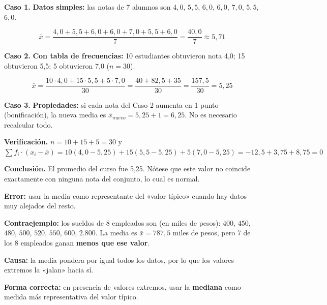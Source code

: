 \documentclass[11pt, letterpaper]{article}
\begin{document}
\begin{tcolorbox}[examplebox, title={Ej. 7. Media aritmética: datos simples, con frecuencia y propiedades}]
\noindent\textbf{Caso 1.} \textbf{Datos simples:} las notas de 7 alumnos son $4{,}0$, $5{,}5$, $6{,}0$, $6{,}0$, $7{,}0$, $5{,}5$, $6{,}0$.

  \[
  \bar{x} = \frac{4{,}0 + 5{,}5 + 6{,}0 + 6{,}0 + 7{,}0 + 5{,}5 + 6{,}0}{7} = \frac{40{,}0}{7} \approx 5{,}71
  \]
\medskip

\noindent\textbf{Caso 2.} \textbf{Con tabla de frecuencias:} 10 estudiantes obtuvieron nota 4{,}0; 15 obtuvieron 5{,}5; 5 obtuvieron 7{,}0 ($n = 30$).

  \[
  \bar{x} = \frac{10 \cdot 4{,}0 + 15 \cdot 5{,}5 + 5 \cdot 7{,}0}{30} = \frac{40 + 82{,}5 + 35}{30} = \frac{157{,}5}{30} = 5{,}25
  \]
\medskip

\noindent\textbf{Caso 3.} \textbf{Propiedades:} si cada nota del Caso 2 aumenta en 1 punto (bonificación), la nueva media es $\bar{x}_{nuevo} = 5{,}25 + 1 = 6{,}25$. No es necesario recalcular todo.
\medskip

\noindent\textbf{Verificación.} $n = 10 + 15 + 5 = 30$ \checkmark \quad y \quad $\sum f_i \cdot (x_i - \bar{x}) = 10(4{,}0-5{,}25)+15(5{,}5-5{,}25)+5(7{,}0-5{,}25) = -12{,}5+3{,}75+8{,}75 = 0$ \checkmark
\medskip

\noindent\textbf{Conclusión.} El promedio del curso fue 5{,}25. Nótese que este valor no coincide exactamente con ninguna nota del conjunto, lo cual es normal.

\end{tcolorbox}

\begin{tcolorbox}[warningbox, title={Error frecuente: la media distorsionada por valores extremos}]
\textbf{Error:} usar la media como representante del «valor típico» cuando hay datos muy alejados del resto.

\medskip

\textbf{Contraejemplo:} los sueldos de 8 empleados son (en miles de pesos):
$400$, $450$, $480$, $500$, $520$, $550$, $600$, $2.800$.
La media es $\bar{x} = 787{,}5$ miles de pesos, pero 7 de los 8 empleados ganan \textbf{menos que ese valor}.

\medskip

\textbf{Causa:} la media pondera por igual todos los datos, por lo que los valores extremos la «jalan» hacia sí.

\medskip

\textbf{Forma correcta:} en presencia de valores extremos, usar la \textbf{mediana} como medida más representativa del valor típico.
\end{tcolorbox}
\end{document}
